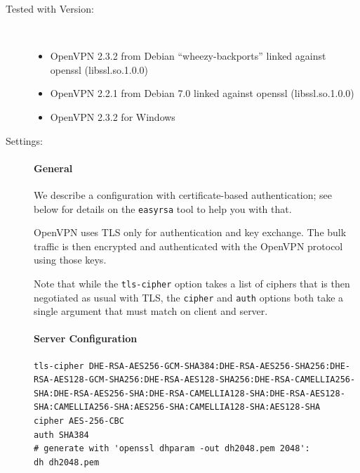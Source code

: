 \begin{description}

\item[Tested with Version:] \mbox{}\\

\begin{itemize}
\item OpenVPN 2.3.2 from Debian ``wheezy-backports'' linked against openssl (libssl.so.1.0.0) 
\item OpenVPN 2.2.1 from Debian 7.0 linked against openssl
    (libssl.so.1.0.0) 
\item OpenVPN 2.3.2 for Windows
\end{itemize}

\item[Settings:] \mbox{}

\paragraph{General}\mbox{}

We describe a configuration with certificate-based authentication; see
below for details on the \verb|easyrsa| tool to help you with that.

OpenVPN uses TLS only for authentication and key exchange. The
bulk traffic is then encrypted and authenticated with the OpenVPN
protocol using those keys.

Note that while the \verb|tls-cipher| option takes a list of ciphers
that is then negotiated as usual with TLS, the \verb|cipher|
and \verb|auth| options both take a single argument that must match on
client and server.

\paragraph{Server Configuration}\mbox{}


\begin{lstlisting}[breaklines]
tls-cipher DHE-RSA-AES256-GCM-SHA384:DHE-RSA-AES256-SHA256:DHE-RSA-AES128-GCM-SHA256:DHE-RSA-AES128-SHA256:DHE-RSA-CAMELLIA256-SHA:DHE-RSA-AES256-SHA:DHE-RSA-CAMELLIA128-SHA:DHE-RSA-AES128-SHA:CAMELLIA256-SHA:AES256-SHA:CAMELLIA128-SHA:AES128-SHA
cipher AES-256-CBC
auth SHA384
# generate with 'openssl dhparam -out dh2048.pem 2048':
dh dh2048.pem
\end{lstlisting}


\end{description}
